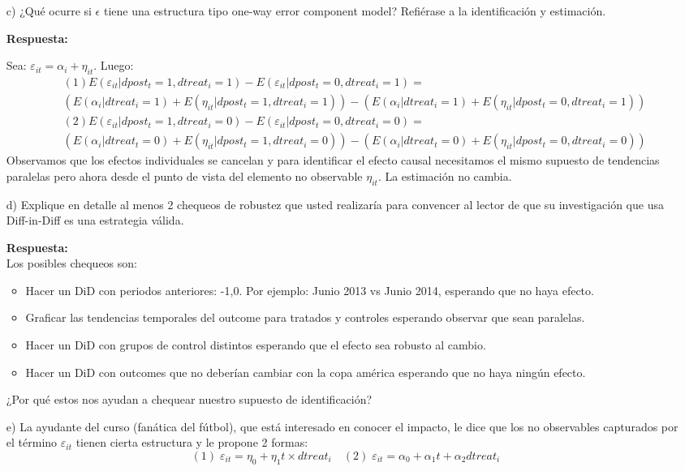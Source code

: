 \documentclass[11pt]{article}
\begin{document}
\begin{enumerate}
\item[c)] ¿Qué ocurre si $\epsilon$ tiene una estructura tipo one-way error component model? Refiérase a la identificación y estimación.

\textbf{Respuesta:}

Sea: $\varepsilon_{it}=\alpha_i+\eta_{it}$. Luego:
\begin{eqnarray*}
&& (1) E(\varepsilon_{it} |dpost_t=1,dtreat_i=1)-E(\varepsilon_{it} |dpost_t=0,dtreat_i=1) = \\ && (E(\alpha_i |dtreat_i=1)+E(\eta_{it} |dpost_t=1,dtreat_i=1))
-(E(\alpha_i |dtreat_i=1)+E(\eta_{it} |dpost_t=0,dtreat_i=1))\\
&& (2) E(\varepsilon_{it} |dpost_t=1,dtreat_i=0)-E(\varepsilon_{it} |dpost_t=0,dtreat_i=0) = \\ &&  (E(\alpha_i |dtreat_t=0)+E(\eta_{it} |dpost_t=1,dtreat_i=0))
-(E(\alpha_i |dtreat_t=0)+E(\eta_{it} |dpost_t=0,dtreat_i=0))
\end{eqnarray*}
Observamos que los efectos individuales se cancelan y para identificar el efecto causal necesitamos el mismo supuesto de tendencias paralelas pero ahora desde el punto de vista del elemento no observable $\eta_{it}$. La estimación no cambia.

\item[d)] Explique en detalle al menos 2 chequeos de robustez que usted realizaría para convencer al lector de que su investigación que usa Diff-in-Diff es una estrategia válida.

\textbf{Respuesta:}\\
Los posibles chequeos son:
	\begin{itemize}
	\item Hacer un DiD con periodos anteriores: -1,0. Por ejemplo: Junio 2013 vs Junio 2014, esperando que no haya efecto.
	\item Graficar las tendencias temporales del outcome para tratados y controles esperando observar que sean paralelas.
	\item Hacer un DiD con grupos de control distintos esperando que el efecto sea robusto al cambio.
	\item Hacer un DiD con outcomes que no deberían cambiar con la copa américa esperando que no haya ningún efecto.
	\end{itemize}
¿Por qué estos nos ayudan a chequear nuestro supuesto de identificación?

\item[e)] La ayudante del curso (fanática del fútbol), que está interesado en conocer el impacto, le dice que los no observables capturados por el término $\varepsilon_{it}$ tienen cierta estructura y le propone 2 formas:
\begin{equation*}
(1)\; \varepsilon_{it}=\eta_0+ \eta_1 t \times dtreat_i \quad (2) \; \varepsilon_{it}=\alpha_0+\alpha_1 t + \alpha_2 dtreat_i
\end{equation*}


\end{enumerate}
\end{document}
